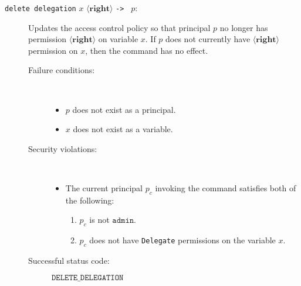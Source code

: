 \documentclass[11pt]{article}
\begin{document}
\begin{description}
\item[\texttt{delete delegation} $x$ $\langle\mathbf{right}\rangle$ \texttt{->\ } $p$:] Updates the access control policy so that principal $p$ no longer has permission $\langle\mathbf{right}\rangle$ on variable $x$. If $p$ does not currently have $\langle\mathbf{right}\rangle$ permission on $x$, then the command has no effect.
\begin{description}
\item[Failure conditions:]\ \\[-1.5em]
\begin{itemize}
\item $p$ does not exist as a principal.
\item $x$ does not exist as a variable.
\end{itemize}
\item[Security violations:]\ \\[-1.5em]
\begin{itemize}
\item The current principal $p_c$ invoking the command satisfies {\color{red} both} of the following:
\begin{enumerate} 
\item $p_c$ is not $\mathtt{admin}$.
\item $p_c$ does not have \texttt{Delegate} permissions on the variable $x$.
\end{enumerate}
\end{itemize}
\item[Successful status code:] $\mathtt{DELETE\_DELEGATION}$
\end{description}
\end{description}
\end{document}
